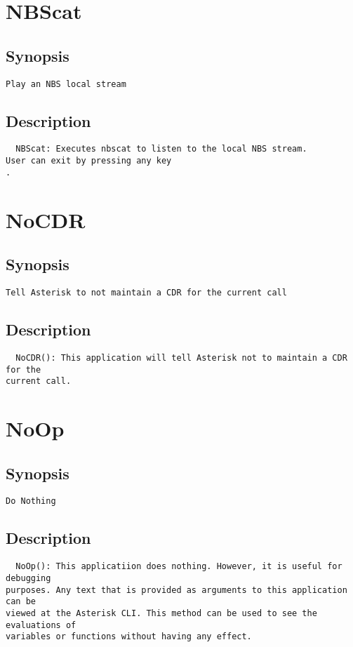 \section{NBScat}
\subsection{Synopsis}
\begin{verbatim}
Play an NBS local stream
\end{verbatim}
\subsection{Description}
\begin{verbatim}
  NBScat: Executes nbscat to listen to the local NBS stream.
User can exit by pressing any key
.
\end{verbatim}


\section{NoCDR}
\subsection{Synopsis}
\begin{verbatim}
Tell Asterisk to not maintain a CDR for the current call
\end{verbatim}
\subsection{Description}
\begin{verbatim}
  NoCDR(): This application will tell Asterisk not to maintain a CDR for the
current call.

\end{verbatim}


\section{NoOp}
\subsection{Synopsis}
\begin{verbatim}
Do Nothing
\end{verbatim}
\subsection{Description}
\begin{verbatim}
  NoOp(): This applicatiion does nothing. However, it is useful for debugging
purposes. Any text that is provided as arguments to this application can be
viewed at the Asterisk CLI. This method can be used to see the evaluations of
variables or functions without having any effect.
\end{verbatim}


